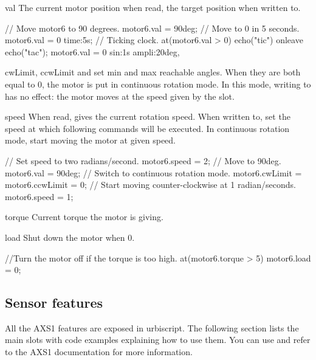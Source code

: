 \begin{urbiscriptapi}
\item[val] The current motor position when read, the target position when
  written to.

\begin{urbiunchecked}
// Move motor6 to 90 degrees.
motor6.val = 90deg;
// Move to 0 in 5 seconds.
motor6.val = 0 time:5s;
// Ticking clock.
at(motor6.val > 0) echo("tic") onleave echo("tac");
motor6.val = 0 sin:1s ampli:20deg,
\end{urbiunchecked}

\item[cwLimit, ccwLimit]  and
   set min and max reachable angles. When they are
  both equal to 0, the motor is put in continuous rotation mode. In this
  mode, writing to  has no effect: the motor moves at the
  speed given by the  slot.

\item[speed] When read, gives the current rotation speed. When written to,
  set the speed at which following commands will be executed. In continuous
  rotation mode, start moving the motor at given speed.
\begin{urbiunchecked}
// Set speed to two radians/second.
motor6.speed = 2;
// Move to 90deg.
motor6.val = 90deg;
// Switch to continuous rotation mode.
motor6.cwLimit = motor6.ccwLimit = 0;
// Start moving counter-clockwise at 1 radian/seconds.
motor6.speed = 1;
\end{urbiunchecked}

\item[torque]
  Current torque the motor is giving.

\item[load]
  Shut down the motor when 0.

\begin{urbiunchecked}
//Turn the motor off if the torque is too high.
at(motor6.torque > 5) motor6.load = 0;
\end{urbiunchecked}

\end{urbiscriptapi}

\subsection{Sensor features}
\def\currentObject{AXS1}

All the AXS1 features are exposed in urbiscript. The following section lists
the main slots with code examples explaining how to use them.  You can use
 and refer to the AXS1 documentation for
more information.


